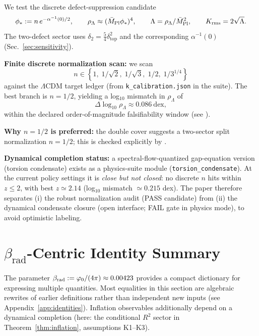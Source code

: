 \begin{tcolorbox}[colback=gray!5, colframe=gray!60,
title={\textbf{Closure-level candidate: discrete $\rho_\Lambda$ with no continuous knobs}}, fonttitle=\bfseries\small]
We test the discrete defect-suppression candidate
\[
\phi_\ast := n\,e^{-\alpha^{-1}(0)/2},
\qquad
\rho_\Lambda \approx (\bar{M}_{\mathrm{Pl}} \phi_\ast)^4,
\qquad
\Lambda=\rho_\Lambda/\bar{M}_{\mathrm{Pl}}^2,
\qquad
K_{\mathrm{rms}}=2\sqrt{\Lambda}.
\]
The two-defect sector uses $\delta_2=\tfrac54\delta_{\mathrm{top}}^2$ and the corresponding $\alpha^{-1}(0)$ (Sec.~\ref{sec:sensitivity}).

\textbf{Finite discrete normalization scan:} we scan
\[
n\in\left\{1,\;1/\sqrt{2},\;1/\sqrt{3},\;1/2,\;1/3^{1/4}\right\}
\]
against the $\Lambda$CDM target ledger (from \texttt{k\_calibration.json} in the suite).
The best branch is $n=1/2$, yielding a log$_{10}$ mismatch in $\rho_\Lambda$ of
\[
\Delta\log_{10}\rho_\Lambda \approx 0.086~\text{dex},
\]
within the declared order-of-magnitude falsifiability window (see ).

\textbf{Why $n=1/2$ is preferred:} the double cover suggests a two-sector split normalization $n=1/2$; this is checked explicitly by .

\textbf{Dynamical completion status:} a spectral-flow-quantized gap-equation version (torsion condensate) exists as a physics-suite module (\texttt{torsion\_condensate}). At the current policy settings it is \emph{close but not closed}: no discrete $n$ hits within $z\le 2$, with best $z\simeq 2.14$ (log$_{10}$ mismatch $\simeq 0.215$ dex). The paper therefore separates (i) the robust normalization audit (PASS candidate) from (ii) the dynamical condensate closure (open interface; FAIL gate in physics mode), to avoid optimistic labeling.
\end{tcolorbox}

\section{\texorpdfstring{$\beta_{\text{rad}}$-Centric Identity Summary}{beta_rad-Centric Identity Summary}}

The parameter $\beta_{\text{rad}} := \varphi_0/(4\pi) \approx 0.00423$ provides a compact dictionary for expressing multiple quantities. 
Most equalities in this section are algebraic rewrites of earlier definitions rather than independent new inputs (see Appendix~\ref{app:identities}). 
Inflation observables additionally depend on a dynamical completion (here: the conditional $R^2$ sector in Theorem~\ref{thm:inflation}, assumptions K1--K3).

